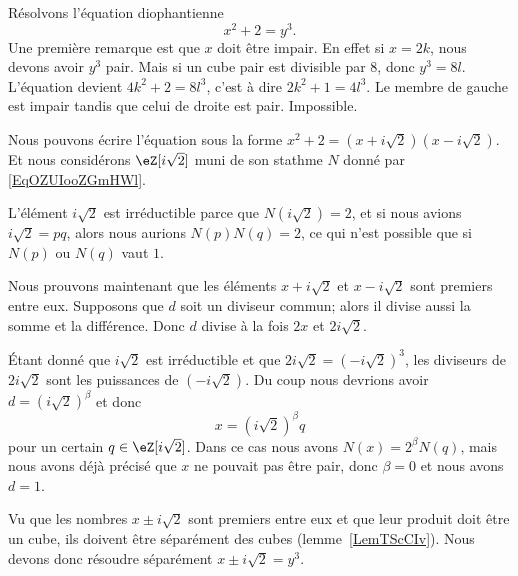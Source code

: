 \begin{example}     \label{ExmuQisZU}
    Résolvons l'équation diophantienne
    \begin{equation}
        x^2+2=y^3.
    \end{equation}
    Une première remarque est que \( x\) doit être impair. En effet si \( x=2k\), nous devons avoir \( y^3\) pair. Mais si un cube pair est divisible par \( 8\), donc \( y^3=8l\). L'équation devient \( 4k^2+2=8l^3\), c'est à dire \( 2k^2+1=4l^3\). Le membre de gauche est impair tandis que celui de droite est pair. Impossible.

    Nous pouvons écrire l'équation sous la forme \( x^2+2=(x+i\sqrt{2})(x-i\sqrt{2})\). Et nous considérons \( \eZ[i\sqrt{2}]\) muni de son stathme \( N\) donné par \eqref{EqOZUIooZGmHWl}.

    L'élément \( i\sqrt{2}\) est irréductible parce que \( N(i\sqrt{2})=2\), et si nous avions \( i\sqrt{2}=pq\), alors nous aurions \( N(p)N(q)=2\), ce qui n'est possible que si \( N(p)\) ou \( N(q)\) vaut \( 1\).

    Nous prouvons maintenant que les éléments \( x+i\sqrt{2}\) et \( x-i\sqrt{2}\) sont premiers entre eux. Supposons que \( d\) soit un diviseur commun; alors il divise aussi la somme et la différence. Donc \( d\) divise à la fois \( 2x\) et \( 2i\sqrt{2}\).

    Étant donné que \( i\sqrt{2}\) est irréductible et que \( 2i\sqrt{2}=(-i\sqrt{2})^3\), les diviseurs de \( 2i\sqrt{2}\) sont les puissances de \( (-i\sqrt{2})\). Du coup nous devrions avoir \( d=(i\sqrt{2})^{\beta}\) et donc
    \begin{equation}
        x=(i\sqrt{2})^{\beta}q
    \end{equation}
    pour un certain \( q\in\eZ[i\sqrt{2}]\). Dans ce cas nous avons \( N(x)=2^{\beta}N(q)\), mais nous avons déjà précisé que \( x\) ne pouvait pas être pair, donc \( \beta=0\) et nous avons \( d=1\).

    Vu que les nombres \( x\pm i\sqrt{2}\) sont premiers entre eux et que leur produit doit être un cube, ils doivent être séparément des cubes (lemme~\ref{LemTScCIv}). Nous devons donc résoudre séparément \( x\pm i\sqrt{2}=y^3\).


\end{example}

